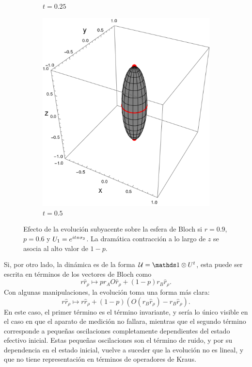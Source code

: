 \begin{figure}[ht!]
\begin{subfigure}{0.32\textwidth}
      \caption{$t=0.25$}
    \end{subfigure}
    \begin{subfigure}{0.32\textwidth}
      \centering
      \includegraphics[width=0.9\linewidth]{chapter3/figures_separable/U1xU2_H1=Pi(sz)_H2=Id_z=0.9_p=0.6t=0.5.png}
      \caption{$t=0.5$}
    \end{subfigure}
    \caption{Efecto de la evolución subyacente sobre la esfera de Bloch si $r=0.9$, $p=0.6$ y $U_{1}=e^{it\pi \sigma_{3}}$. La dramática contracción a lo largo de $z$ se asocia al alto valor de $1-p$.}
    \label{fig:FaseChangeSequence}
\end{figure}

Si, por otro lado, la dinámica es de la forma $\mcU=\Id\otimes U^{t}$, esta puede ser escrita en términos de los vectores de Bloch como
\begin{equation*}
    r\hat{r}_{\rho}\mapsto pr_{A}O\hat{r}_{\rho}+(1-p)r_{B}\hat{r}_{\rho}.
\end{equation*}
Con algunas manipulaciones, la evolución toma una forma más clara:
\begin{equation*}
    r\hat{r}_{\rho}\mapsto r\hat{r}_{\rho}+(1-p)(O(r_{B}\hat{r}_{\rho})-r_{B}\hat{r}_{\rho}).
\end{equation*}
En este caso, el primer término es el término invariante, y sería lo único visible en el caso en que el aparato de medición no fallara, mientras que el segundo término corresponde a pequeñas oscilaciones completamente dependientes del estado efectivo inicial. Estas pequeñas oscilaciones son el término de ruido, y por su dependencia en el estado inicial, vuelve a suceder que la evolución no es lineal, y que no tiene representación en términos de operadores de Kraus.


